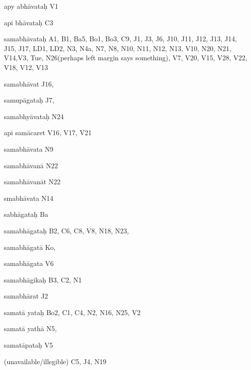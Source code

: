 \begin{ekdosis}
\begin{marma}[hp01_055]
\begin{marma}[hp02_009]
\begin{marma}[hp02_011]
\begin{marma}[hp02_021d]
\item[apy abhāvataḥ] V1
\item[api bhāvataḥ] C3
\item[samabhāvataḥ] A1, B1, Ba5, Bo1, Bo3, C9, J1, J3, J6, J10, J11, J12, J13, J14, J15, J17, LD1, LD2, N3, N4a, N7, N8, N10, N11, N12, N13, V10, N20, N21, V14,V3, Tue, N26(perhaps left margin says something), V7, V20, V15, V28, V22, V18, V12, V13
\item[samabhāvat] J16,
\item[samupāgataḥ] J7,
\item[samabhyāvataḥ] N24
\item[api samācaret] V16, V17, V21
\item[samabhāvata]  N9
\item[samabhāvanā] N22
\item[samabhāvanāt] N22
\item[smabhāvata]  N14
\item[sabhāgataḥ] Ba
\item[samabhāgataḥ] B2, C6, C8, V8, N18, N23, 
\item[samabhāgatā] Ko,
\item[samabhāgata] V6
\item[samabhāgikaḥ] B3, C2, N1
\item[samabhārat] J2
\item[samatā yataḥ]  Bo2, C1, C4, N2, N16, N25, V2
\item[samatā yathā]   N5,
\item[samatāpataḥ] V5
\item[(unavailable/illegible)] C5, J4, N19
 \begin{description}

        \end{description}
\end{marma}


\begin{marma}[hp02_022a-c]
\sthana{}
 \begin{description}
        \end{description}
\end{marma}



\end{marma}
\end{marma}
\end{marma}
\end{ekdosis}
